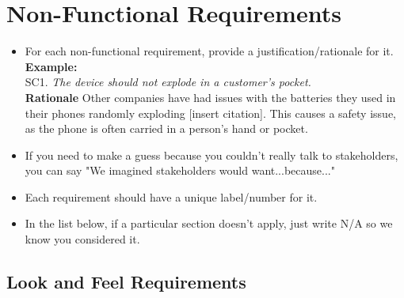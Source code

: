 \documentclass[]{article}
\begin{document}

\section{Non-Functional Requirements}
\label{sec:non-functional_requirements}


\begin{itemize}
	\item For each non-functional requirement, provide a justification/rationale for it.\\
	      {\bf Example:} \\
	      SC1. \emph{The device should not explode in a customer’s pocket.}\\
	      {\bf Rationale} Other companies have had issues with the batteries they used in their phones randomly exploding [insert citation]. This causes a safety issue, as the phone is often carried in a person's hand or pocket.
	\item If you need to make a guess because you couldn't really talk to stakeholders, you can say "We imagined stakeholders would want...because..."
	\item Each requirement should have a unique label/number for it.
	\item In the list below, if a particular section doesn't apply, just write N/A so we know you considered it.
\end{itemize}

\subsection{Look and Feel Requirements}
\label{sub:look_and_feel_requirements}
\end{document}
